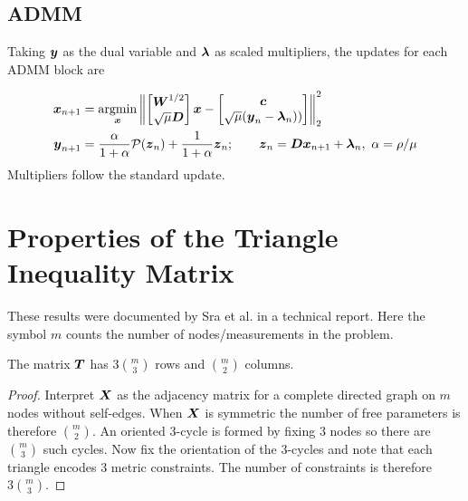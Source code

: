 \documentclass{article}
\begin{document}
\subsection*{ADMM}

Taking $\boldsymbol{y}$ as the dual variable and $\boldsymbol{\lambda}$ as scaled multipliers, the updates for each ADMM block are

\begin{align*}
  \boldsymbol{x}_{n+1}
  &= \underset{\boldsymbol{x}}{\mathop{\rm argmin}\nolimits} \left\|
    \begin{bmatrix}
      \boldsymbol{W}^{1/2} \\
      \sqrt{\mu} \boldsymbol{D}
    \end{bmatrix} \boldsymbol{x}
    -
    \begin{bmatrix}
      \boldsymbol{c} \\
      \sqrt{\mu} (\boldsymbol{y}_{n} - \boldsymbol{\lambda}_{n}))
    \end{bmatrix}
  \right\|_{2}^{2} \\
  \boldsymbol{y}_{n+1}
  &= \frac{\alpha}{1+\alpha} \mathcal{P}(\boldsymbol{z}_{n}) + \frac{1}{1+\alpha} \boldsymbol{z}_{n};
  \qquad \boldsymbol{z}_{n} = \boldsymbol{D} \boldsymbol{x}_{n+1} + \boldsymbol{\lambda}_{n},~\alpha = \rho / \mu
\end{align*}
Multipliers follow the standard update.

\section*{\center Properties of the Triangle Inequality Matrix}

These results were documented by Sra et al. in a technical report.
Here the symbol $m$ counts the number of nodes/measurements in the problem.

\begin{proposition}
    The matrix \(\boldsymbol{T}\) has \(3 \binom{m}{3}\) rows and \(\binom{m}{2}\) columns.
\end{proposition}
\begin{proof}
    Interpret \(\boldsymbol{X}\) as the adjacency matrix for a complete directed graph on \(m\) nodes without self-edges.
    When \(\boldsymbol{X}\) is symmetric the number of free parameters is therefore \(\binom{m}{2}\).
    An oriented \(3\)-cycle is formed by fixing \(3\) nodes so there are \(\binom{m}{3}\) such cycles.
    Now fix the orientation of the \(3\)-cycles and note that each triangle encodes \(3\) metric constraints.
    The number of constraints is therefore \(3 \binom{m}{3}\).
\end{proof}
\end{document}
